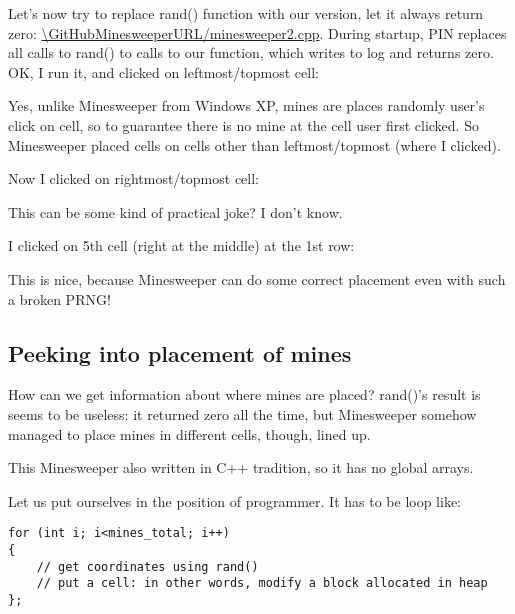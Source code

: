 Let's now try to replace rand() function with our version, let it always return zero: \url{\GitHubMinesweeperURL/minesweeper2.cpp}.
During startup, PIN replaces all calls to rand() to calls to our function, which writes to log and returns zero.
OK, I run it, and clicked on leftmost/topmost cell:

\begin{figure}[H]
\centering
{}
\end{figure}

Yes, unlike Minesweeper from Windows XP, mines are places randomly  user's click on cell, so to guarantee
there is no mine at the cell user first clicked.
So Minesweeper placed cells on cells other than leftmost/topmost (where I clicked).

Now I clicked on rightmost/topmost cell:

\begin{figure}[H]
\centering
{}
\end{figure}

This can be some kind of practical joke? I don't know.

I clicked on 5th cell (right at the middle) at the 1st row:

\begin{figure}[H]
\centering
{}
\end{figure}

This is nice, because Minesweeper can do some correct placement even with such a broken \ac{PRNG}!

\subsection{Peeking into placement of mines}

How can we get information about where mines are placed?
rand()'s result is seems to be useless: it returned zero all the time, but Minesweeper somehow managed to place
mines in different cells, though, lined up.

This Minesweeper also written in C++ tradition, so it has no global arrays.

Let us put ourselves in the position of programmer.
It has to be loop like:

\begin{lstlisting}
for (int i; i<mines_total; i++)
{
	// get coordinates using rand()
	// put a cell: in other words, modify a block allocated in heap
};
\end{lstlisting}

